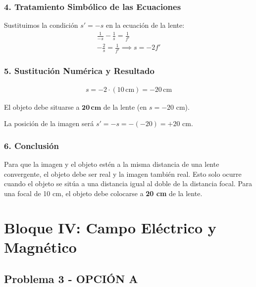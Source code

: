 \subsubsection*{4. Tratamiento Simbólico de las Ecuaciones}
Sustituimos la condición $s' = -s$ en la ecuación de la lente:
\begin{gather}
    \frac{1}{-s} - \frac{1}{s} = \frac{1}{f'} \nonumber \\[8pt]
    -\frac{2}{s} = \frac{1}{f'} \implies s = -2f'
\end{gather}

\subsubsection*{5. Sustitución Numérica y Resultado}
\begin{gather}
    s = -2 \cdot (10 \, \text{cm}) = -20 \, \text{cm}
\end{gather}
\begin{cajaresultado}
    El objeto debe situarse a $\boldsymbol{20 \, cm}$ de la lente (en $s=-20$ cm).
\end{cajaresultado}
La posición de la imagen será $s' = -s = -(-20) = +20$ cm.

\subsubsection*{6. Conclusión}
\begin{cajaconclusion}
    Para que la imagen y el objeto estén a la misma distancia de una lente convergente, el objeto debe ser real y la imagen también real. Esto solo ocurre cuando el objeto se sitúa a una distancia igual al doble de la distancia focal. Para una focal de 10 cm, el objeto debe colocarse a \textbf{20 cm} de la lente.
\end{cajaconclusion}

\newpage

\section{Bloque IV: Campo Eléctrico y Magnético}
\label{sec:em_2005_jun_cv}

\subsection{Problema 3 - OPCIÓN A}
\label{subsec:4A_2005_jun_cv}

